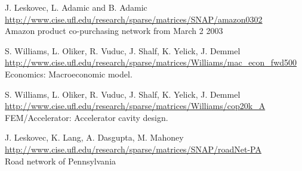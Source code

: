 	{
		{
			J. Leskovec, L. Adamic and B. Adamic 
		}
		{
			\url{http://www.cise.ufl.edu/research/sparse/matrices/SNAP/amazon0302} \\
			Amazon product co-purchasing network from March 2 2003
		}
	}

	{
		{
			S. Williams, L. Oliker, R. Vuduc, J. Shalf, K. Yelick, J. Demmel 
		}
		{
			\url{http://www.cise.ufl.edu/research/sparse/matrices/Williams/mac_econ_fwd500} \\
			Economics: Macroeconomic model.
		}
	}

	{
		{
			S. Williams, L. Oliker, R. Vuduc, J. Shalf, K. Yelick, J. Demmel 
		}
		{
			\url{http://www.cise.ufl.edu/research/sparse/matrices/Williams/cop20k_A} \\
			FEM/Accelerator: Accelerator cavity design.
		}
	}

	{
		{
			J. Leskovec, K. Lang, A. Dasgupta, M. Mahoney 
		}
		{
			\url{http://www.cise.ufl.edu/research/sparse/matrices/SNAP/roadNet-PA} \\
			Road network of Pennsylvania
		}
	}

	\begin{comment}
	\taskdescription{TS--ST}{\textsc{webbase--1M.mtx}}
	{
		\taskdescfield{Authors}
		{
			S. Williams, L. Oliker, R. Vuduc, J. Shalf, K. Yelick, J. Demmel 
		}
		\taskdescfield{Description}
		{
			\url{http://www.cise.ufl.edu/research/sparse/matrices/Williams/webbase-1M} \\
			webbase: Web connectivity matrix.
		}
		\taskdescfield{Type}{\textbf{coordinate real general}}
		\taskdescfield{Dimension}{\textbf{1000005} x \textbf{1000005}}
		\taskdescfield{Non-zeros}{\textbf{3105536}}		
	}
	\end{comment}
	
